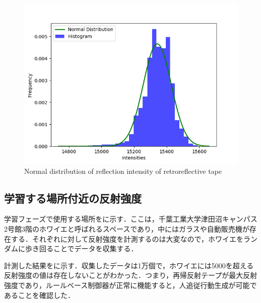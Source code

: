   \begin{figure}[h]
    \centering
    \includegraphics[keepaspectratio, scale=0.50] {images/RobotGuidance_plot_reflection_intensities_of_tape.png}
    \captionsetup{justification=raggedright} %
    \caption{Normal distribution of reflection intensity of retroreflective tape}
    \label{Fig:Normal distribution of reflection intensity of retroreflective tape}
  \end{figure}

\newpage

\subsection{学習する場所付近の反射強度}

  学習フェーズで使用する場所をに示す．ここは，千葉工業大学津田沼キャンパス2号館3階のホワイエと呼ばれるスペースであり，中にはガラスや自動販売機が存在する．それぞれに対して反射強度を計測するのは大変なので，ホワイエをランダムに歩き回ることでデータを収集する．

  計測した結果をに示す．収集したデータは1万個で，ホワイエには5000を超える反射強度の値は存在しないことがわかった．つまり，再帰反射テープが最大反射強度であり，ルールベース制御器が正常に機能すると，人追従行動生成が可能であることを確認した．

